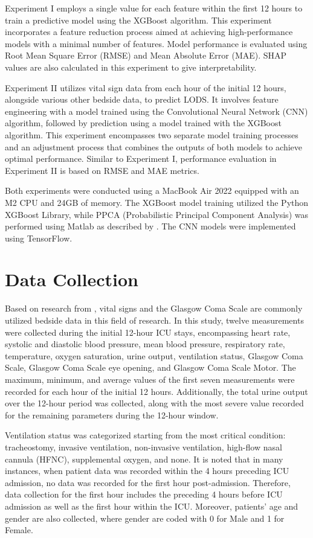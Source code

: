 \documentclass[12pt,a4paper,english
]{tunithesis}
\begin{document}
Experiment I employs a single value for each feature within the first 12 hours to train a predictive model using the XGBoost algorithm. This experiment incorporates a feature reduction process aimed at achieving high-performance models with a minimal number of features. Model performance is evaluated using Root Mean Square Error (RMSE) and Mean Absolute Error (MAE). SHAP values are also calculated in this experiment to give interpretability.

Experiment II utilizes vital sign data from each hour of the initial 12 hours, alongside various other bedside data, to predict LODS. It involves feature engineering with a model trained using the Convolutional Neural Network (CNN) algorithm, followed by prediction using a model trained with the XGBoost algorithm. This experiment encompasses two separate model training processes and an adjustment process that combines the outputs of both models to achieve optimal performance. Similar to Experiment I, performance evaluation in Experiment II is based on RMSE and MAE metrics.

Both experiments were conducted using a MacBook Air 2022 equipped with an M2 CPU and 24GB of memory. The XGBoost model training utilized the Python XGBoost Library, while PPCA (Probabilistic Principal Component Analysis) was performed using Matlab as described by \textcite{jakob2015}. The CNN models were implemented using TensorFlow.

\section{Data Collection}
Based on research from \textcite{asuroglu2021, johnson2013}, vital signs and the Glasgow Coma Scale are commonly utilized bedside data in this field of research. In this study, twelve measurements were collected during the initial 12-hour ICU stays, encompassing heart rate, systolic and diastolic blood pressure, mean blood pressure, respiratory rate, temperature, oxygen saturation, urine output, ventilation status, Glasgow Coma Scale, Glasgow Coma Scale eye opening, and Glasgow Coma Scale Motor. The maximum, minimum, and average values of the first seven measurements were recorded for each hour of the initial 12 hours. Additionally, the total urine output over the 12-hour period was collected, along with the most severe value recorded for the remaining parameters during the 12-hour window.

Ventilation status was categorized starting from the most critical condition: tracheostomy, invasive ventilation, non-invasive ventilation, high-flow nasal cannula (HFNC), supplemental oxygen, and none. It is noted that in many instances, when patient data was recorded within the 4 hours preceding ICU admission, no data was recorded for the first hour post-admission. Therefore, data collection for the first hour includes the preceding 4 hours before ICU admission as well as the first hour within the ICU. Moreover, patients' age and gender are also collected, where gender are coded with 0 for Male and 1 for Female.
\end{document}
